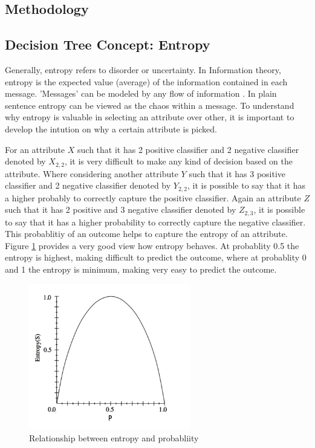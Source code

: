 \documentclass{article}
\begin{document}
\subsection{Methodology}

\subsection{Decision Tree Concept: Entropy}
Generally, entropy refers to disorder or uncertainty. In Information theory, entropy is the expected value (average) of the information contained in each message. 'Messages' can be modeled by any flow of information \cite{wikientropy}. In plain sentence entropy can be viewed as the chaos within a message. To understand why entropy is valuable in selecting an attribute over other, it is important to develop the intution on why a certain attribute is picked.

For an attribute ${X}$ such that it has 2 positive classifier and 2 negative classifier denoted by ${X_{2,2}}$, it is very difficult to make any kind of decision based on the attribute. Where considering another attribute ${Y}$ such that it has 3 positive classifier and 2 negative classifier denoted by ${Y_{2,2}}$, it is possible to say that it has a higher probably to correctly capture the positive classifier. Again an attribute ${Z}$ such that it has 2 positive and 3 negative classifier denoted by ${Z_{2,3}}$, it is possible to say that it has a higher probability to correctly capture the negative classifier. This probablitiy of an outcome helps to capture the entropy of an attribute. Figure \ref{fig:entropy} provides a very good view how entropy behaves. At probablity 0.5 the entropy is highest, making difficult to predict the outcome, where at probablity  0 and 1 the entropy is minimum, making very easy to predict the outcome.

\begin{figure}[H]
	\centering
	\includegraphics[width=200pt]{entropy}
	\caption{Relationship between entropy and probabliity}
	\label{fig:entropy}
\end{figure}
\end{document}
